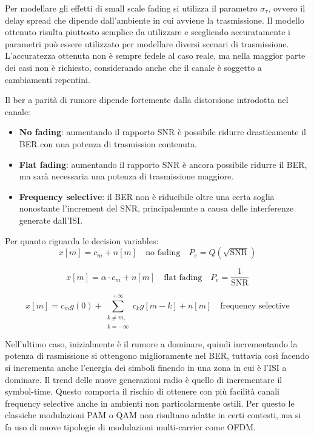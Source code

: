 Per modellare gli effetti di small scale fading si utilizza il parametro $\sigma_\tau$, ovvero il delay spread che dipende dall'ambiente in cui avviene la trasmissione. Il modello ottenuto risulta piuttosto semplice da utilizzare e secgliendo accuratamente i parametri può essere utilizzato per modellare diversi scenari di trasmissione. L'accuratezza ottenuta non è sempre fedele al caso reale, ma nella maggior parte dei casi non è richiesto, considerando anche che il canale è soggetto a cambiamenti repentini.

Il ber a parità di rumore dipende fortemente dalla distorsione introdotta nel canale:
\begin{itemize}
    \item \textbf{No fading}: aumentando il rapporto SNR è possibile ridurre drasticamente il BER con una potenza di trasmission contenuta.
    \item \textbf{Flat fading}: aumentando il rapporto SNR è ancora possibile ridurre il BER, ma sarà necessaria una potenza di trasmissione maggiore.
    \item \textbf{Frequency selective}: il BER non è riducibile oltre una certa soglia nonostante l'increment del SNR, principalemnte a causa delle interferenze generate dall'ISI.
\end{itemize}

Per quanto riguarda le decision variables:
\[
    x\left[m\right] = c_m + n\left[m\right] \quad \text{no fading} \quad P_e = Q(\sqrt{\text{SNR}})
\]

\[
    x\left[m\right] = \alpha \cdot c_m + n\left[m\right] \quad \text{flat fading} \quad P_e = \frac{1}{\text{SNR}}
\]

\[
    x\left[m\right] = c_m g(0) + \sum_{\substack{k \neq m,\\ k=-\infty}}^{+\infty} c_{k} g\left[m-k\right] + n\left[m\right] \quad \text{frequency selective}
\]

Nell'ultimo caso, inizialmente è il rumore a dominare, quindi incrementando la potenza di rasmissione si ottengono miglioramente nel BER, tuttavia così facendo si incrementa anche l'energia dei simboli finendo in una zona in cui è l'ISI a dominare.
Il trend delle nuove generazioni radio è quello di incrementare il symbol-time. Questo comporta il rischio di ottenere con più facilità canali frequency selective anche in ambienti non particolarmente ostili. Per questo le classiche modulazioni PAM o QAM non risultano adatte in certi contesti, ma si fa uso di nuove tipologie di modulazioni multi-carrier come OFDM.


